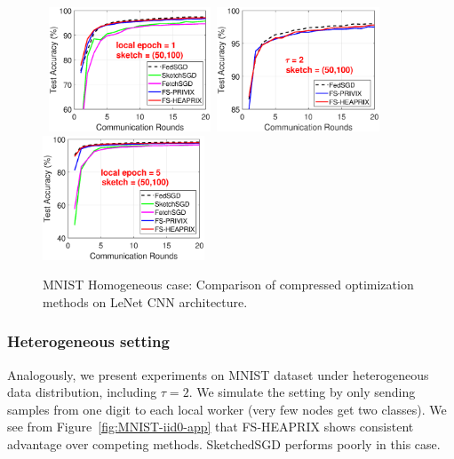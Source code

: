 \documentclass{article} %
\begin{document}
\begin{figure}[h]
\begin{center}
		\mbox{%
		\includegraphics[width=1.9in]{MNIST_figures/local1_sketch50_iid1_test_acc.eps}%
		\includegraphics[width=1.9in]{MNIST_figures/local2_sketch50_iid1_test_acc.eps} %
		\includegraphics[width=1.9in]{MNIST_figures/local5_sketch50_iid1_test_acc.eps}
		}
	\end{center}
	\caption{MNIST Homogeneous case: Comparison of compressed optimization methods on LeNet CNN architecture.}
    \label{fig:MNIST-iid1-app}
\end{figure}

\subsubsection{Heterogeneous setting}

Analogously, we present experiments on MNIST dataset under heterogeneous data distribution, including $\tau=2$. We simulate the setting by only sending samples from one digit to each local worker (very few nodes get two classes). We see from Figure~\ref{fig:MNIST-iid0-app} that FS-HEAPRIX shows consistent advantage over competing methods. SketchedSGD performs poorly in this case.
\end{document}
